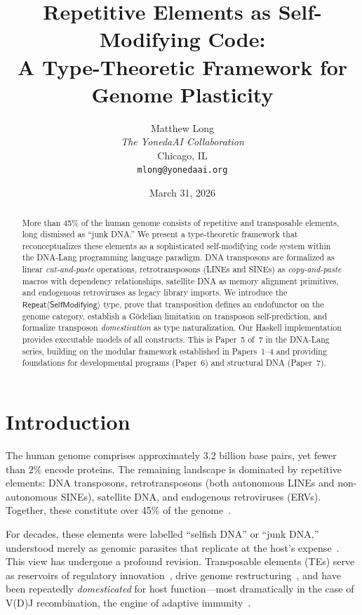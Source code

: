 \documentclass[12pt,a4paper]{article}
\title{\textbf{Repetitive Elements as Self-Modifying Code:\\
A Type-Theoretic Framework for Genome Plasticity}}
\author{Matthew Long \\
\textit{The YonedaAI Collaboration} \\
Chicago, IL \\
\texttt{mlong@yonedaai.org}}
\date{March 31, 2026}
\newcommand{\Repeat}{\mathsf{Repeat}}
\begin{document}
\maketitle

\begin{abstract}
More than 45\% of the human genome consists of repetitive and transposable elements,
long dismissed as ``junk DNA.'' We present a type-theoretic framework that reconceptualizes
these elements as a sophisticated self-modifying code system within the DNA-Lang programming
language paradigm. DNA transposons are formalized as linear \emph{cut-and-paste} operations,
retrotransposons (LINEs and SINEs) as \emph{copy-and-paste} macros with dependency
relationships, satellite DNA as memory alignment primitives, and endogenous retroviruses
as legacy library imports. We introduce the $\Repeat\langle\mathsf{SelfModifying}\rangle$
type, prove that transposition defines an endofunctor on the genome category, establish
a G\"odelian limitation on transposon self-prediction, and formalize transposon
\emph{domestication} as type naturalization. Our Haskell implementation provides executable
models of all constructs. This is Paper~5 of~7 in the DNA-Lang series, building on the
modular framework established in Papers~1--4 and providing foundations for developmental
programs (Paper~6) and structural DNA (Paper~7).
\end{abstract}

\tableofcontents
\newpage

\section{Introduction}\label{sec:intro}

The human genome comprises approximately 3.2 billion base pairs, yet fewer than 2\%
encode proteins. The remaining landscape is dominated by repetitive elements: DNA
transposons, retrotransposons (both autonomous LINEs and non-autonomous SINEs),
satellite DNA, and endogenous retroviruses (ERVs). Together, these constitute over
45\% of the genome~\cite{lander2001,debarros2008}.

For decades, these elements were labelled ``selfish DNA'' or ``junk DNA,'' understood
merely as genomic parasites that replicate at the host's expense~\cite{orgel1980,doolittle1980}.
This view has undergone a profound revision. Transposable elements (TEs) serve as
reservoirs of regulatory innovation~\cite{feschotte2008}, drive genome
restructuring~\cite{kazazian2004}, and have been repeatedly \emph{domesticated} for
host function---most dramatically in the case of V(D)J recombination, the engine of
adaptive immunity~\cite{agrawal1998}.
\end{document}
